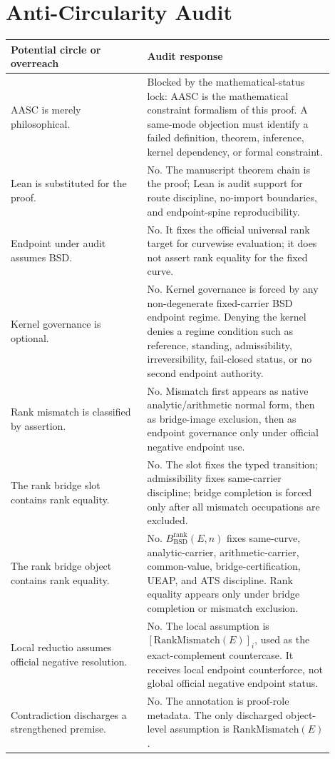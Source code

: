 \documentclass[11pt]{article}
\newcommand{\BSD}{\mathrm{BSD}}
\newcommand{\RankMismatch}{\mathrm{RankMismatch}}
\newcommand{\BsdRankBridge}{B^{\mathrm{rank}}_{\BSD}}
\begin{document}
\section{Anti-Circularity Audit}
\begin{longtable}{L{0.38\linewidth}L{0.52\linewidth}}
\toprule
\textbf{Potential circle or overreach} & \textbf{Audit response}\\
\midrule
AASC is merely philosophical. & Blocked by the mathematical-status lock: AASC is the mathematical constraint formalism of this proof. A same-mode objection must identify a failed definition, theorem, inference, kernel dependency, or formal constraint.\\
Lean is substituted for the proof. & No. The manuscript theorem chain is the proof; Lean is audit support for route discipline, no-import boundaries, and endpoint-spine reproducibility.\\
Endpoint under audit assumes BSD. & No. It fixes the official universal rank target for curvewise evaluation; it does not assert rank equality for the fixed curve.\\
Kernel governance is optional. & No. Kernel governance is forced by any non-degenerate fixed-carrier BSD endpoint regime. Denying the kernel denies a regime condition such as reference, standing, admissibility, irreversibility, fail-closed status, or no second endpoint authority.\\
Rank mismatch is classified by assertion. & No. Mismatch first appears as native analytic/arithmetic normal form, then as bridge-image exclusion, then as endpoint governance only under official negative endpoint use.\\
The rank bridge slot contains rank equality. & No. The slot fixes the typed transition; admissibility fixes same-carrier discipline; bridge completion is forced only after all mismatch occupations are excluded.\\
The rank bridge object contains rank equality. & No. $\BsdRankBridge(E,n)$ fixes same-curve, analytic-carrier, arithmetic-carrier, common-value, bridge-certification, UEAP, and ATS discipline. Rank equality appears only under bridge completion or mismatch exclusion.\\
Local reductio assumes official negative resolution. & No. The local assumption is $[\RankMismatch(E)]_i$, used as the exact-complement countercase. It receives local endpoint counterforce, not global official negative endpoint status.\\
Contradiction discharges a strengthened premise. & No. The annotation is proof-role metadata. The only discharged object-level assumption is $\RankMismatch(E)$.\\

\end{longtable}
\end{document}
